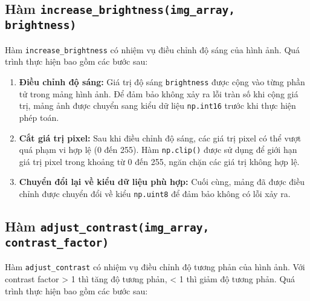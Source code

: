 \subsection{Hàm \texttt{increase\_brightness(img\_array, brightness)}}
Hàm \texttt{increase\_brightness} có nhiệm vụ điều chỉnh độ sáng của hình ảnh. Quá trình thực hiện bao gồm các bước sau:

\begin{enumerate}

	\item \textbf{Điều chỉnh độ sáng:}
	      Giá trị độ sáng \texttt{brightness} được cộng vào từng phần tử trong mảng hình ảnh. Để đảm bảo không xảy ra lỗi tràn số khi cộng giá trị, mảng ảnh được chuyển sang kiểu dữ liệu \texttt{np.int16} trước khi thực hiện phép toán.

	\item \textbf{Cắt giá trị pixel:}
	      Sau khi điều chỉnh độ sáng, các giá trị pixel có thể vượt quá phạm vi hợp lệ (0 đến 255). Hàm \texttt{np.clip()} được sử dụng để giới hạn giá trị pixel trong khoảng từ 0 đến 255, ngăn chặn các giá trị không hợp lệ.

	\item \textbf{Chuyển đổi lại về kiểu dữ liệu phù hợp:}
	      Cuối cùng, mảng đã được điều chỉnh được chuyển đổi về kiểu \texttt{np.uint8} để đảm bảo không có lỗi xảy ra.

\end{enumerate}



\subsection{Hàm \texttt{adjust\_contrast(img\_array, contrast\_factor)}}
Hàm \texttt{adjust\_contrast} có nhiệm vụ điều chỉnh độ tương phản của hình ảnh. Với contrast factor > 1 thì tăng độ tương phản, < 1 thì giảm độ tương phản. Quá trình thực hiện bao gồm các bước sau:

